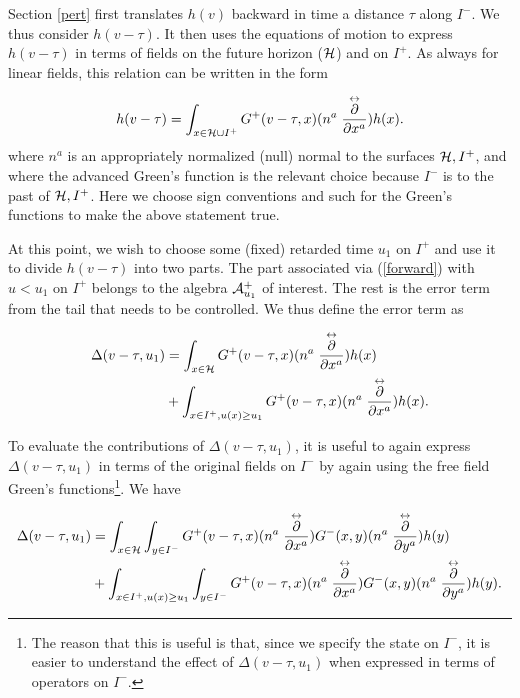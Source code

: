 \documentclass[12pt,onecolumn,eqsecnum,aps,prd,nofootinbib]{revtex4}
\begin{document}
Section \ref{pert} first translates $h(v)$ backward in time a distance $\tau$ along $I^-$.  We thus consider $h(v-\tau)$.  It then uses the equations of motion to express $h(v-\tau)$ in terms of fields on the future horizon (${\cal H}$) and on $I^+$.  As always for linear fields, this relation can be written in the form

\begin{equation}
\label{forward}
h(v - \tau) = \int_{x \in {\cal H} \cup I^+}  G^+(v-\tau, x)   (n^a  \stackrel
{\leftrightarrow} {\frac{ \partial}{\partial x^a} }) h(x) .
\end{equation}
where $n^a$ is an appropriately normalized (null) normal to the surfaces ${\cal H}, I^+$, and where the advanced Green's function is the relevant choice because $I^-$ is to the past of ${\cal H}, I^+$.  Here we choose sign conventions and such for the Green's functions to make the above statement true.

At this point, we wish to choose some (fixed) retarded time $u_1$ on $I^+$ and use it to divide $h(v-\tau)$ into two parts.  The part associated via (\ref{forward}) with $u < u_1$ on $I^+$ belongs to the algebra ${\cal A}_{u_1}^+$ of interest.  The rest is the error term from the tail that needs to be controlled.  We thus define the error term as

\begin{equation}
\begin{split}
\label{forward}
\Delta(v - \tau, u_1) &= \int_{x \in {\cal H}}  G^+(v-\tau, x)   (n^a  \stackrel
{\leftrightarrow} {\frac{ \partial}{\partial x^a} }) h(x)\\
& +  \int_{x \in {I^+}, u(x) \ge u_1}  G^+(v-\tau, x)   (n^a  \stackrel
{\leftrightarrow} {\frac{ \partial}{\partial x^a} }) h(x) .
\end{split}
\end{equation}

To evaluate the contributions of $\Delta(v-\tau, u_1)$, it is useful to {\rm again} express $\Delta(v-\tau, u_1)$ in terms of the original fields on $I^-$ by again using the free field Green's functions\footnote{The reason that this is useful is that, since we specify the state on $I^-$, it is easier to understand the effect of 
$\Delta(v-\tau, u_1)$ when expressed in terms of operators on $I^-$.}.  We have

\begin{equation}
\begin{split}
\label{forback}
\Delta(v - \tau, u_1) &= \int_{x \in {\cal H}} \int_{y \in I^-} G^+(v-\tau, x)   (n^a  \stackrel
{\leftrightarrow} {\frac{ \partial}{\partial x^a} }) G^-(x, y)   (n^a  \stackrel
{\leftrightarrow} {\frac{ \partial}{\partial y^a} })  h(y) \\
 &+  \int_{x \in {I^+}, u(x) \ge u_1}  \int_{y \in I^-} G^+(v-\tau, x)   (n^a  \stackrel
{\leftrightarrow} {\frac{ \partial}{\partial x^a} }) G^-(x, y)   (n^a  \stackrel
{\leftrightarrow} {\frac{ \partial}{\partial y^a} })  h(y) .
\end{split}
\end{equation}
\end{document}
